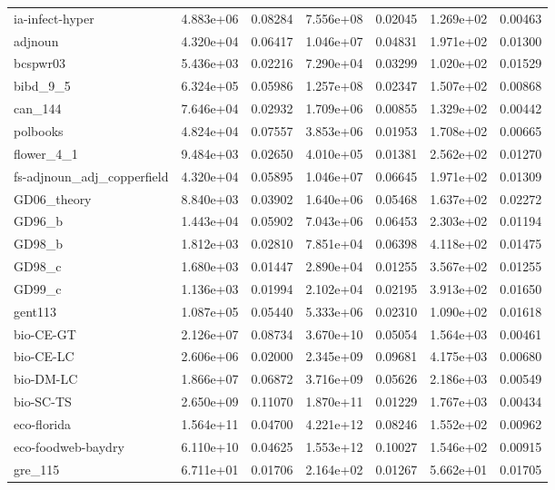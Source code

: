 \documentclass[senior,final,11pt]{iscs-thesis}
\begin{document}
\begin{table}[htb]
\begin{center}
{\begin{tabular}{l | c c | c c | c c }
        ia-infect-hyper & 4.883e+06 & 0.08284 & 7.556e+08 & 0.02045 & 1.269e+02 & 0.00463\\
        adjnoun & 4.320e+04 & 0.06417 & 1.046e+07 & 0.04831 & 1.971e+02 & 0.01300\\
        bcspwr03 & 5.436e+03 & 0.02216 & 7.290e+04 & 0.03299 & 1.020e+02 & 0.01529\\
        bibd\_9\_5 & 6.324e+05 & 0.05986 & 1.257e+08 & 0.02347 & 1.507e+02 & 0.00868\\
        can\_144 & 7.646e+04 & 0.02932 & 1.709e+06 & 0.00855 & 1.329e+02 & 0.00442\\
        polbooks & 4.824e+04 & 0.07557 & 3.853e+06 & 0.01953 & 1.708e+02 & 0.00665\\
        flower\_4\_1 & 9.484e+03 & 0.02650 & 4.010e+05 & 0.01381 & 2.562e+02 & 0.01270\\
        fs-adjnoun\_adj\_copperfield & 4.320e+04 & 0.05895 & 1.046e+07 & 0.06645 & 1.971e+02 & 0.01309\\
        GD06\_theory & 8.840e+03 & 0.03902 & 1.640e+06 & 0.05468 & 1.637e+02 & 0.02272\\
        GD96\_b & 1.443e+04 & 0.05902 & 7.043e+06 & 0.06453 & 2.303e+02 & 0.01194\\
        GD98\_b & 1.812e+03 & 0.02810 & 7.851e+04 & 0.06398 & 4.118e+02 & 0.01475\\
        GD98\_c & 1.680e+03 & 0.01447 & 2.890e+04 & 0.01255 & 3.567e+02 & 0.01255\\
        GD99\_c & 1.136e+03 & 0.01994 & 2.102e+04 & 0.02195 & 3.913e+02 & 0.01650\\
        gent113 & 1.087e+05 & 0.05440 & 5.333e+06 & 0.02310 & 1.090e+02 & 0.01618\\
        bio-CE-GT & 2.126e+07 & 0.08734 & 3.670e+10 & 0.05054 & 1.564e+03 & 0.00461\\
        bio-CE-LC & 2.606e+06 & 0.02000 & 2.345e+09 & 0.09681 & 4.175e+03 & 0.00680\\
        bio-DM-LC & 1.866e+07 & 0.06872 & 3.716e+09 & 0.05626 & 2.186e+03 & 0.00549\\
        bio-SC-TS & 2.650e+09 & 0.11070 & 1.870e+11 & 0.01229 & 1.767e+03 & 0.00434\\
        eco-florida & 1.564e+11 & 0.04700 & 4.221e+12 & 0.08246 & 1.552e+02 & 0.00962\\
        eco-foodweb-baydry & 6.110e+10 & 0.04625 & 1.553e+12 & 0.10027 & 1.546e+02 & 0.00915\\
        gre\_115 & 6.711e+01 & 0.01706 & 2.164e+02 & 0.01267 & 5.662e+01 & 0.01705\\

\end{tabular}}
\end{center}
\end{table}
\end{document}

